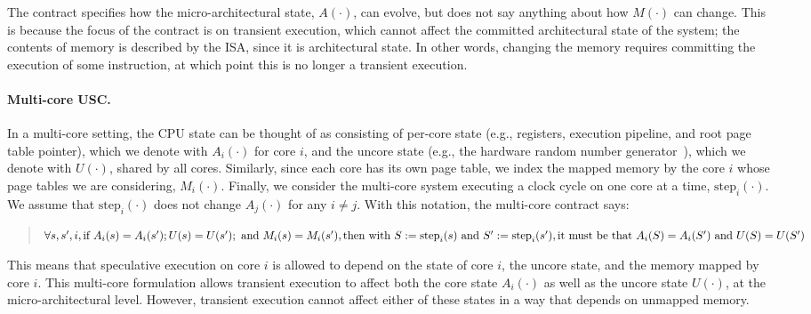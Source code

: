 The contract specifies how the micro-architectural state, $A(\cdot)$,
can evolve, but does not say anything about how $M(\cdot)$ can change.
This is because the focus of the contract is on transient execution,
which cannot affect the committed architectural state of the system; the
contents of memory is described by the ISA, since it is architectural
state.  In other words, changing the memory requires committing the
execution of some instruction, at which point this is no longer a
transient execution.

\paragraph{Multi-core USC.} In a multi-core setting, the CPU state can be thought of as consisting
of per-core state (e.g., registers, execution pipeline, and root
page table pointer), which we denote with $A_i(\cdot)$ for core $i$,
and the uncore state (e.g., the hardware random number
generator~\cite{ragab:crosstalk}), which we denote with $U(\cdot)$,
shared by all cores.  Similarly, since each core has its own page table,
we index the mapped memory by the core $i$ whose page tables we are
considering, $M_i(\cdot)$.  Finally, we consider the multi-core system
executing a clock cycle on one core at a time, $\textrm{step}_i(\cdot)$.
We assume that $\textrm{step}_i(\cdot)$ does not change $A_j(\cdot)$ for
any $i\neq j$.
With this notation, the multi-core contract says:

\begin{small}
\begin{quote}
$\forall s, s', i, \\
  \textrm{if~} A_i(s) = A_i(s');
               U(s) = U(s');
  \textrm{~and~} M_i(s) = M_i(s'), \\
  \textrm{then~with~} S := \textrm{step}_i(s)
  \textrm{~and~} S' := \textrm{step}_i(s'), \\
  \textrm{it~must~be~that~} A_i(S) = A_i(S')
  \textrm{~and~} U(S) = U(S')$
\end{quote}
\end{small}

This means that speculative execution on core $i$ is allowed to depend on
the state of core $i$, the uncore state, and the memory mapped by core
$i$.  This multi-core formulation allows transient execution to affect
both the core state $A_i(\cdot)$ as well as the uncore state $U(\cdot)$,
at the micro-architectural level.  However, transient execution cannot
affect either of these states in a way that depends on unmapped memory.

